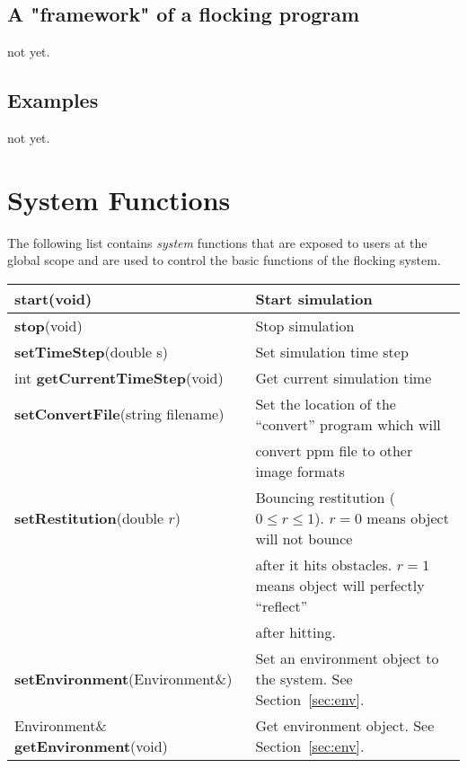 \documentclass[onecolumn,10pt]{article}
\begin{document}
\subsection{A "framework" of a flocking program}
not yet.

\subsection{Examples}
not yet.


\section{System Functions}

The following list contains {\em system} functions that are exposed to users at 
the global scope and are used to control the basic functions of the flocking system. \\

\begin{tabular}{|l|l|}\hline
{\bf start}(void)                       & Start simulation \\\hline
{\bf stop}(void)                        & Stop simulation \\\hline
{\bf setTimeStep}(double s)             & Set simulation time step\\\hline
int {\bf getCurrentTimeStep}(void)      & Get current simulation time\\\hline
{\bf setConvertFile}(string filename)   & Set the location of the ``convert'' program which will \\
                                        & convert ppm file to other image formats\\\hline
{\bf setRestitution}(double $r$)        & Bouncing restitution ($0 \le r \le 1$). $r=0$ means object will not bounce \\
                                        & after it hits obstacles. $r=1$ means object will perfectly ``reflect'' \\
				        &  after hitting. \\\hline
{\bf setEnvironment}(Environment\&)     & Set an environment object to the system. See Section~\ref{sec:env}. \\\hline
Environment\& {\bf getEnvironment}(void)& Get environment object. See Section~\ref{sec:env}. \\\hline				
\end{tabular}
\end{document}
